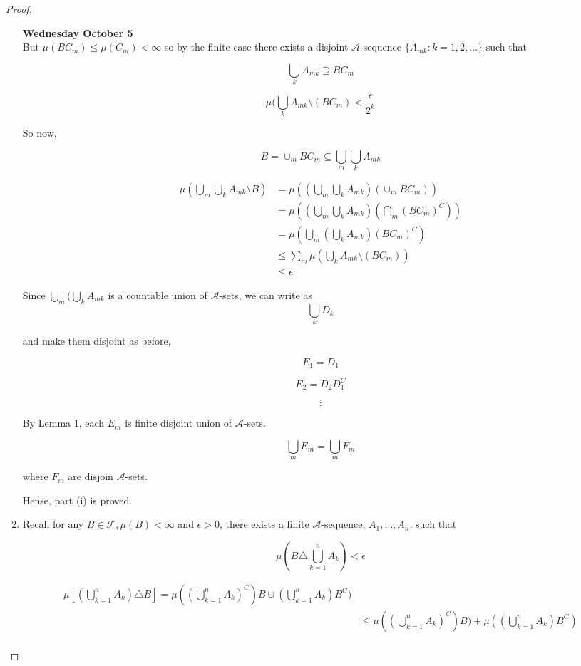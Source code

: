 \documentclass[11pt,fleqn]{book} %
\begin{document}
\begin{proof}
\begin{enumerate}
\textbf{Wednesday October 5}\\

		But $\mu(B C_m) \leq \mu(C_m) < \infty$ so by the finite case there exists a disjoint $\mathcal{A}$-sequence $\{A_{mk}: k = 1, 2, \dots \}$ such that

				$$\bigcup_k A_{mk} \supseteq BC_m $$

				$$\mu(\bigcup_k A_{mk} \setminus (B C_m) < \frac{\epsilon}{2^k} $$

		So now, 

				$$B = \cup_m B C_m \subseteq \bigcup_m \bigcup_k A_{mk} $$

				
				\begin{align*}
					\mu (\bigcup_m \bigcup_k A_{mk} \setminus B) &= \mu ((\bigcup_m \bigcup_k A_{mk}) (\cup_m B C_m)) \\
						&= \mu((\bigcup_m \bigcup_k A_{mk}) (\bigcap_m (B C_m)^C)) \\
						&= \mu(\bigcup_m (\bigcup_k A_{mk})(B C_m)^C)\\
						&\leq \sum_m \mu(\bigcup_k A_{mk} \setminus (B C_m))\\
						&\leq \epsilon
				\end{align*}
				
		Since $\bigcup_m (\bigcup_k A_{mk}$ is a countable union of $\mathcal{A}$-sets, we can write as
				$$\bigcup_k D_k $$

		and make them disjoint as before, 

				$$E_1 = D_1 $$

				$$ E_2 = D_2 D_1^C$$

				$$ \vdots $$


		By Lemma 1, each $E_m$ is finite disjoint union of $\mathcal{A}$-sets. 

				$$\bigcup_m E_m = \bigcup_m F_m $$

		where $F_m$ are disjoin $\mathcal{A}$-sets. 

Hense, part (i) is proved.



	\item Recall for any $B\in \mathcal{F}, \mu(B) < \infty$ and $\epsilon > 0$, there exists a finite $\mathcal{A}$-sequence,  $A_1, \dots, A_n$, such that

			$$\mu(B \triangle \bigcup^n_{k=1} A_k ) < \epsilon $$

			\begin{align*}
				\mu\left[(\bigcup^n_{k=1} A_k) \triangle B \right] = \mu((\bigcup^n_{k=1} A_k)^C) B \cup (\bigcup^n_{k=1} A_k) B^C)\\
					&\leq \mu((\bigcup^n_{k=1} A_k)^C) B) + \mu((\bigcup^n_{k=1} A_k) B^C)\\
			\end{align*}


\end{enumerate}
\end{proof}
\end{document}
